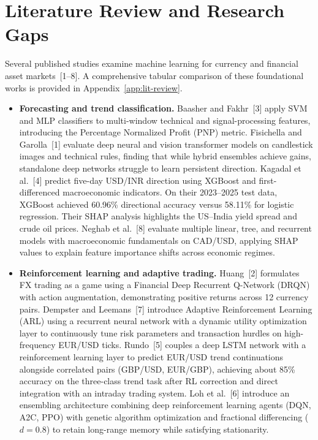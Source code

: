 \documentclass[12pt,a4paper,twoside,openany]{report}
\begin{document}
\chapter{Literature Review and Research Gaps}
Several published studies examine machine learning for currency and financial asset markets~[1--8]. A comprehensive tabular comparison of these foundational works is provided in Appendix~\ref{app:lit-review}.
\begin{itemize}
  \item \textbf{Forecasting and trend classification.} Baasher and Fakhr~[3] apply SVM and MLP classifiers to multi-window technical and signal-processing features, introducing the Percentage Normalized Profit (PNP) metric. Fisichella and Garolla~[1] evaluate deep neural and vision transformer models on candlestick images and technical rules, finding that while hybrid ensembles achieve gains, standalone deep networks struggle to learn persistent direction. Kagadal et al.~[4] predict five-day USD/INR direction using XGBoost and first-differenced macroeconomic indicators. On their 2023--2025 test data, XGBoost achieved 60.96\% directional accuracy versus 58.11\% for logistic regression. Their SHAP analysis highlights the US--India yield spread and crude oil prices. Neghab et al.~[8] evaluate multiple linear, tree, and recurrent models with macroeconomic fundamentals on CAD/USD, applying SHAP values to explain feature importance shifts across economic regimes.
  \item \textbf{Reinforcement learning and adaptive trading.} Huang~[2] formulates FX trading as a game using a Financial Deep Recurrent Q-Network (DRQN) with action augmentation, demonstrating positive returns across 12 currency pairs. Dempster and Leemans~[7] introduce Adaptive Reinforcement Learning (ARL) using a recurrent neural network with a dynamic utility optimization layer to continuously tune risk parameters and transaction hurdles on high-frequency EUR/USD ticks. Rundo~[5] couples a deep LSTM network with a reinforcement learning layer to predict EUR/USD trend continuations alongside correlated pairs (GBP/USD, EUR/GBP), achieving about 85\% accuracy on the three-class trend task after RL correction and direct integration with an intraday trading system. Loh et al.~[6] introduce an ensembling architecture combining deep reinforcement learning agents (DQN, A2C, PPO) with genetic algorithm optimization and fractional differencing ($d=0.8$) to retain long-range memory while satisfying stationarity.
\end{itemize}
\end{document}
